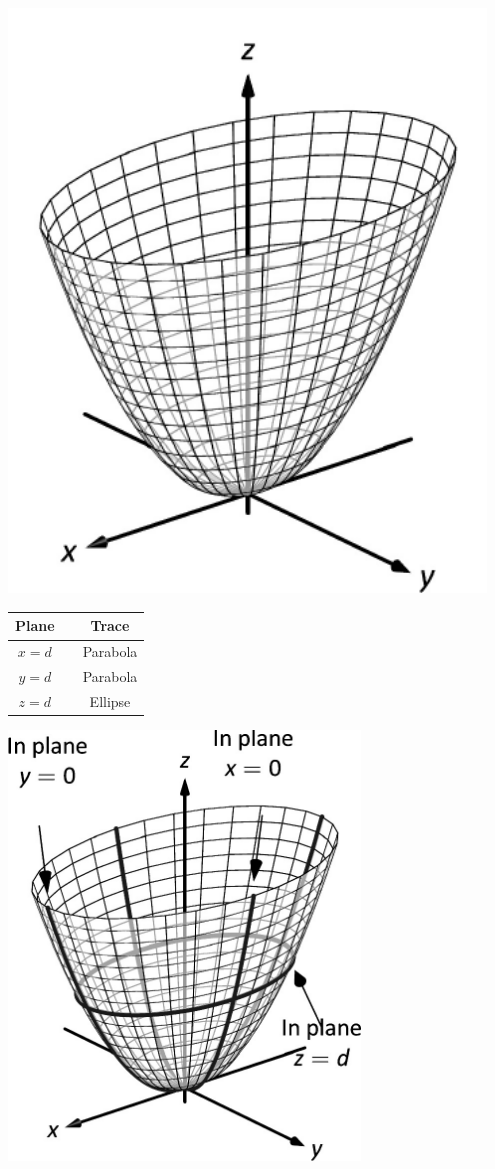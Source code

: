 \begin{minipage}[c]{.3\linewidth}
\vskip0pt
\includegraphics[width=0.95\textwidth]{fig_ana_geo_17a}
\end{minipage}
\begin{minipage}[c]{.25\linewidth}
\vskip0pt\hskip 10pt
\begin{tabular}[]{ccc}
\textbf{Plane}  & & \textbf{Trace} \\ \hline
$x=d$ & & Parabola \\
$y=d$ & & Parabola\\
$z=d$ & & Ellipse
\end{tabular}
\end{minipage}%
\begin{minipage}[c]{.45\linewidth}
\includegraphics[width=0.7\textwidth]{fig_ana_geo_17b}
\end{minipage}
